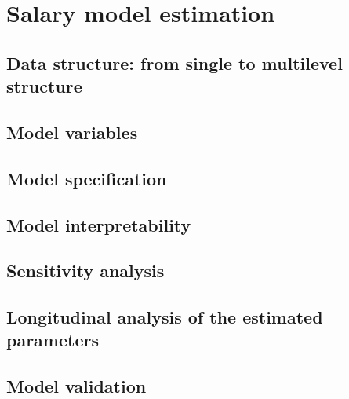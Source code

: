\chapter{Salary model estimation}

\section{Data structure: from single to multilevel structure}
\section{Model variables}
\section{Model specification}
\section{Model interpretability}
\section{Sensitivity analysis}
\section{Longitudinal analysis of the estimated parameters}
\section{Model validation}